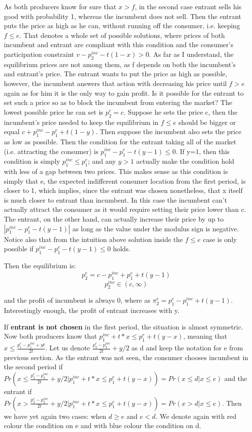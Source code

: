 \documentclass{article}
\begin{document}
As both producers know for sure that $x>f$, in the second case entrant sells his good with probability 1, whereas the incumbent does not sell.
Then the entrant puts the price as high as he can, without running off the consumer, i.e. keeping $f\leq e$. That denotes a whole set of possible solutions, where prices of both incumbent and entrant are compliant with this condition and the consumer's participation constraint $v-p^{inc}_2-t(1-x)>0$. As far as I understand, the equilibrium prices are not among them, as f depends on both the incumbent's and entrant's price. The entrant wants to put the price as high as possible, however, the incumbent answers that action with decreasing his price until $f>e$ again as for him it is the only way to gain profit. Is it possible for the entrant to set such a price so as to block the incumbent from entering the market? The lowest possible price he can set is $p^{e}_2 = c$. Suppose he sets the price c, then the incumbent's price needed to keep the equilibrium in $f\leq e$ should be bigger or equal $c+p^{inc}_1-p^{e}_1 + t(1-y)$. Then suppose the incumbent also sets the price as low as possible. Then the condition for the entrant taking all of the market (i.e. attracting the consumer) is $p^{inc}_1-p^{e}_1 - t(y-1) \leq 0$. If y=1, then this condition is simply $p^{inc}_1 \leq p^{e}_1$; and any $y>1$ actually make the condition hold with less of a gap between two prices. This makes sense as this condition is simply that e, the expected indifferent consumer location from the first period, is closer to 1, which implies, since the entrant was chosen nonetheless, that x itself is much closer to entrant than incumbent. In this case the incumbent can't actually attract the consumer as it would require setting their price lower than c. The entrant, on the other hand, can actually increase their price by up to $|p^{inc}_1 - p^{e}_1 - t(y-1)|$ as long as the value under the modulus sign is negative. Notice also that from the intuition above solution inside the $f\leq e$ case is only possible if $p^{inc}_1 - p^{e}_1 - t(y-1) \leq 0$ holds.

Then the equilibrium is:
$$p^{e}_2  =  c - p^{inc}_1 + p^{e}_1 + t(y-1) 
$$
$$p^{inc}_2 \in (c, \infty)$$

and the profit of incumbent is always 0, where
as $\pi^{e}_2 = p^{e}_1 - p^{inc}_1 + t(y-1)$. Interestingly enough, the profit of entrant increases with y.
 


If \textbf{entrant is not chosen} in the first period, the situation is almost symmetric. Now both producers know that $p_1^{inc}+t*x \leq p_1^{e}+t(y-x)$, meaning that $x \leq \frac{p_1^{e}-p_1^{inc}+yt}{2t}$. Let us denote $\frac{p_2^{e}-p_2^{inc}}{2t}+y/2$ as d and keep the notation for e from previous section. As the entrant was not seen, the consumer chooses incumbent in the second period if $Pr(x \leq \frac{p_2^{e}-p_2^{inc}}{2t}+y/2 | p_1^{inc}+t*x \leq p_1^{e}+t(y-x)) = Pr(x \leq d | x \leq e)$ and the entrant if $Pr(x > \frac{p_2^{e}-p_2^{inc}}{2t}+y/2 | p_1^{inc}+t*x \leq p_1^{e}+t(y-x)) = Pr(x > d| x \leq e)$.  Then we have yet again two cases: when $d \geq e$ and $e<d$. We denote again with red colour the condition on e and with blue colour the condition on d.
\end{document}

